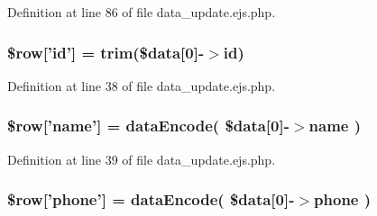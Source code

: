 \-Definition at line 86 of file data\-\_\-update.\-ejs.\-php.

\hypertarget{patientfile_2immnunization_2data__update_8ejs_8php_a4d5e7bc8bd41ef1d4dbfdb851ced695a}{
\subsubsection[{\$row}]{\setlength{\rightskip}{0pt plus 5cm}\$row\mbox{[}'id'\mbox{]} = trim(\$data\mbox{[}0\mbox{]}-\/$>$id)}}\label{patientfile_2immnunization_2data__update_8ejs_8php_a4d5e7bc8bd41ef1d4dbfdb851ced695a}


\-Definition at line 38 of file data\-\_\-update.\-ejs.\-php.

\hypertarget{patientfile_2immnunization_2data__update_8ejs_8php_a63a1136a683bf9c4637010f73791443a}{
\subsubsection[{\$row}]{\setlength{\rightskip}{0pt plus 5cm}\$row\mbox{[}'name'\mbox{]} = {\bf data\-Encode}( \$data\mbox{[}0\mbox{]}-\/$>$name )}}\label{patientfile_2immnunization_2data__update_8ejs_8php_a63a1136a683bf9c4637010f73791443a}


\-Definition at line 39 of file data\-\_\-update.\-ejs.\-php.

\hypertarget{patientfile_2immnunization_2data__update_8ejs_8php_a9eb773d64ffa16faf1e29ccbaf4f065c}{
\subsubsection[{\$row}]{\setlength{\rightskip}{0pt plus 5cm}\$row\mbox{[}'phone'\mbox{]} = {\bf data\-Encode}( \$data\mbox{[}0\mbox{]}-\/$>$phone )}}\label{patientfile_2immnunization_2data__update_8ejs_8php_a9eb773d64ffa16faf1e29ccbaf4f065c}


